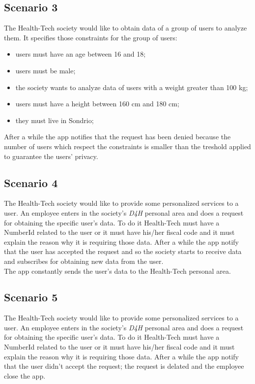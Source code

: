 \subsection{Scenario 3}
The Health-Tech society would like to obtain data of a group of users to analyze them. It specifies those constraints for the group of users:
\begin{itemize}
	\item {users must have an age between 16 and 18;}
	\item {users must be male;}
	\item {the society wants to analyze data of users with a weight greater than 100 kg;}
	\item {users must have a height between 160 cm and 180 cm;}
	\item {they must live in Sondrio;}
\end{itemize}
After a while the app notifies that the request has been denied because the number of users which respect the constraints is smaller than the treshold applied to guarantee the users' privacy. 

\subsection{Scenario 4}
The Health-Tech society would like to provide some personalized services to a user. An employee enters in the society's  \textit{D4H} personal area and does a request for obtaining the specific user's data. 
To do it Health-Tech must have a NumberId related to the user or it must have his/her fiscal code and it must explain the reason why it is requiring those data. After a while the app notify that the user has accepted the request and so the society starts to receive data and subscribes for obtaining new data from the user.\\
The app constantly sends the user's data to the Health-Tech personal area.

\subsection{Scenario 5}
The Health-Tech society would like to provide some personalized services to a user. An employee enters in the society's  \textit{D4H} personal area and does a request for obtaining the specific user's data. 
To do it Health-Tech must have a NumberId related to the user or it must have his/her fiscal code and it must explain the reason why it is requiring those data. After a while the app notify that the user didn't accept the request; the request is delated and the employee close the app.

